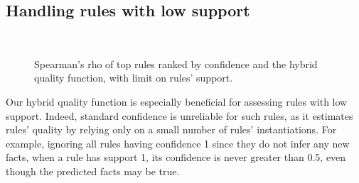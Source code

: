 \subsection{Handling rules with low support}
\begin{figure}[t]
     \centering
     \\
     \caption{Spearman's rho of top rules ranked by confidence and the hybrid quality function, with limit on rules' support.}
     \label{fig:low_sp}
\end{figure}
Our hybrid quality function is especially beneficial for assessing rules with low support. Indeed, standard confidence is unreliable for such rules, as it estimates rules' quality by relying only on a small number of rules' instantiations. For example, ignoring all rules having confidence 1 since they do not infer any new facts, when a rule has support 1, its confidence is never greater than 0.5, even though the predicted facts may be true. 

